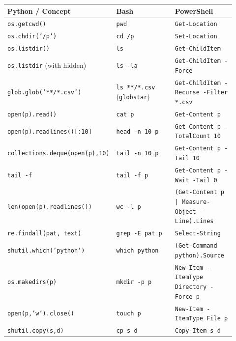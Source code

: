 \documentclass[11pt,a4paper]{article}
\newcommand{\cmd}[1]{\texttt{\textcolor{bashKw}{#1}}}
\newcommand{\pcmd}[1]{\texttt{\textcolor{pyKw}{#1}}}
\newcommand{\pscmd}[1]{\texttt{\textcolor{pwshKw}{#1}}}
\begin{document}
\begin{center}
\renewcommand{\arraystretch}{1.15}
\begin{tabular}{p{0.32\linewidth} p{0.32\linewidth} p{0.28\linewidth}}
\toprule
\textbf{Python / Concept} & \textbf{Bash} & \textbf{PowerShell} \\
\midrule
\pcmd{os.getcwd()}                  & \cmd{pwd}                          & \pscmd{Get-Location} \\
\pcmd{os.chdir('/p')}               & \cmd{cd /p}                        & \pscmd{Set-Location} \\
\pcmd{os.listdir()}                 & \cmd{ls}                           & \pscmd{Get-ChildItem} \\
\pcmd{os.listdir} (with hidden)     & \cmd{ls -la}                       & \pscmd{Get-ChildItem -Force} \\
\pcmd{glob.glob('**/*.csv')}        & \cmd{ls **/*.csv} (\texttt{globstar}) & \pscmd{Get-ChildItem -Recurse -Filter *.csv} \\
\pcmd{open(p).read()}               & \cmd{cat p}                        & \pscmd{Get-Content p} \\
\pcmd{open(p).readlines()[:10]}     & \cmd{head -n 10 p}                 & \pscmd{Get-Content p -TotalCount 10} \\
\pcmd{collections.deque(open(p),10)}& \cmd{tail -n 10 p}                 & \pscmd{Get-Content p -Tail 10} \\
\pcmd{tail -f}                      & \cmd{tail -f p}                    & \pscmd{Get-Content p -Wait -Tail 0} \\
\pcmd{len(open(p).readlines())}     & \cmd{wc -l p}                      & \texttt{(\pscmd{Get-Content} p | \pscmd{Measure-Object} -Line).Lines} \\
\pcmd{re.findall(pat, text)}        & \cmd{grep -E pat p}                & \pscmd{Select-String} \\
\pcmd{shutil.which('python')}       & \cmd{which python}                 & \texttt{(\pscmd{Get-Command} python).Source} \\
\pcmd{os.makedirs(p)}               & \cmd{mkdir -p p}                   & \pscmd{New-Item -ItemType Directory -Force p} \\
\pcmd{open(p,'w').close()}          & \cmd{touch p}                      & \pscmd{New-Item -ItemType File p} \\
\pcmd{shutil.copy(s,d)}             & \cmd{cp s d}                       & \pscmd{Copy-Item s d} \\

\end{tabular}
\end{center}
\end{document}
